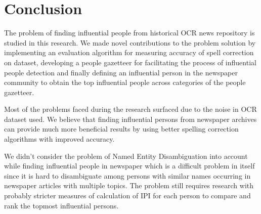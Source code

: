  
       
\section{Conclusion}
\label{influential:conclusion}

The problem of finding influential people from historical OCR news repository is studied in this research. We made novel contributions to the problem solution by implementing an evaluation algorithm for measuring accuracy of spell correction on dataset, developing a people gazetteer for facilitating the process of influential people detection and finally defining an influential person in the newspaper community to obtain the top influential people across categories of the people gazetteer.

Most of the problems faced during the research surfaced due to the noise in OCR dataset used. We believe that finding influential persons from newspaper archives can provide much more beneficial results by using better spelling correction algorithms with improved accuracy.

We didn't consider the problem of Named Entity Disambiguation into account while finding influential people in newspaper which is a difficult problem in itself since it is hard to disambiguate among persons with similar names occurring in newspaper articles with multiple topics. The problem still requires research with probably stricter measures of calculation of IPI for each person to compare and rank the topmost influential persons.
  

                                                           
